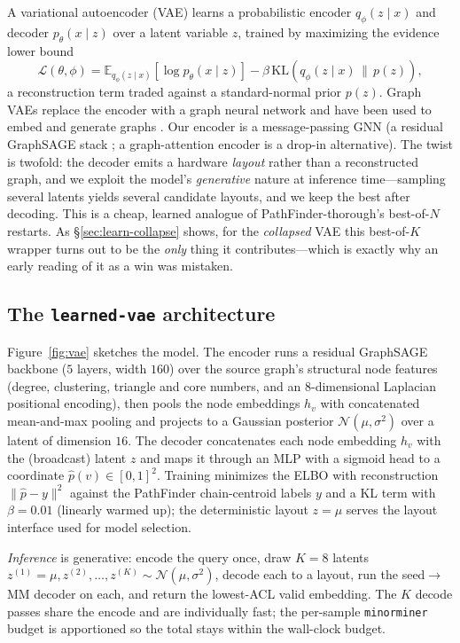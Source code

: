 \documentclass[acmsmall,anonymous,nonacm]{acmart}
\begin{document}
A variational autoencoder (VAE) \cite{kingma2014vae} learns a probabilistic encoder
$q_\phi(z\mid x)$ and decoder $p_\theta(x\mid z)$ over a latent variable $z$,
trained by maximizing the evidence lower bound
\[
  \mathcal{L}(\theta,\phi)=\mathbb{E}_{q_\phi(z\mid x)}\!\left[\log p_\theta(x\mid z)\right]
  -\beta\,\mathrm{KL}\!\left(q_\phi(z\mid x)\,\|\,p(z)\right),
\]
a reconstruction term traded against a standard-normal prior $p(z)$. Graph VAEs
replace the encoder with a graph neural network and have been used to embed and
generate graphs \cite{kipf2016vgae,simonovsky2018graphvae}. Our encoder is a
message-passing GNN (a residual GraphSAGE stack \cite{hamilton2017graphsage}; a
graph-attention encoder \cite{velickovic2018gat} is a drop-in alternative). The
twist is twofold: the decoder emits a hardware \emph{layout} rather than a
reconstructed graph, and we exploit the model's \emph{generative} nature at
inference time---sampling several latents yields several candidate layouts, and we
keep the best after decoding. This is a cheap, learned analogue of
PathFinder-thorough's best-of-$N$ restarts. As \S\ref{sec:learn-collapse} shows, for
the \emph{collapsed} VAE this best-of-$K$ wrapper turns out to be the \emph{only}
thing it contributes---which is exactly why an early reading of it as a win was
mistaken.

\subsection{The \texttt{learned-vae} architecture}
\label{sec:learn-arch}

Figure~\ref{fig:vae} sketches the model. The encoder runs a residual GraphSAGE
backbone ($5$ layers, width $160$) over the source graph's structural node features
(degree, clustering, triangle and core numbers, and an $8$-dimensional Laplacian
positional encoding), then pools the node embeddings $h_v$ with concatenated
mean-and-max pooling and projects to a Gaussian posterior $\mathcal{N}(\mu,\sigma^2)$
over a latent of dimension $16$. The decoder concatenates each node embedding $h_v$
with the (broadcast) latent $z$ and maps it through an MLP with a sigmoid head to a
coordinate $\hat{p}(v)\in[0,1]^2$. Training minimizes the ELBO with reconstruction
$\lVert \hat{p}-y\rVert^2$ against the PathFinder chain-centroid labels $y$ and a
KL term with $\beta{=}0.01$ (linearly warmed up); the deterministic layout $z{=}\mu$
serves the layout interface used for model selection.

\emph{Inference} is generative: encode the query once, draw $K{=}8$ latents
$z^{(1)}{=}\mu, z^{(2)},\dots,z^{(K)}\sim\mathcal{N}(\mu,\sigma^2)$, decode each to a
layout, run the seed$\rightarrow$MM decoder on each, and return the lowest-ACL valid
embedding. The $K$ decode passes share the encode and are individually fast; the
per-sample \texttt{minorminer} budget is apportioned so the total stays within the
wall-clock budget.
\end{document}
